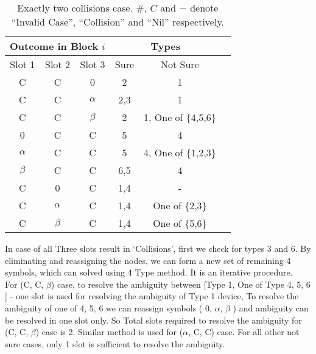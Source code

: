 \documentclass[fleqn]{article}
\begin{document}
\begin {table} 
\centering
\begin{tabular}{|c|c|c|c|c|c|} 
\hline
\multicolumn{3}{|c|}{Outcome in Block $i$} & \multicolumn{2}{c|}{Types} \\ \hline
Slot 1       & Slot 2       & Slot 3       & Sure & Not Sure            \\ \hline
C            & C            & 0            & 2    & 1                   \\ \hline
C            & C            & $\alpha$     & 2,3  & 1                   \\ \hline
C            & C            & $\beta$      & 2    & 1, One of \{4,5,6\} \\ \hline
0            & C            & C            & 5    & 4                   \\ \hline
$\alpha$     & C            & C            & 5    & 4, One of \{1,2,3\} \\ \hline
$\beta$      & C            & C            & 6,5  & 4                   \\ \hline
C            & 0            & C            & 1,4  & -                   \\ \hline
C            & $\alpha$     & C            & 1,4  & One of \{2,3\}      \\ \hline
C            & $\beta$      & C            & 1,4  & One of \{5,6\}      \\ \hline

\end{tabular}
\caption{Exactly two collisions case. \#, $C$ and $-$ denote ``Invalid Case'', ``Collision'' and  ``Nil'' respectively.}
\label{Tab_TwoC1}
\end{table}


In case of all Three slots result in `Collisions', first we check for types 3 and 6. By eliminating and reassigning the nodes, we can form a new set of remaining 4 symbols, which can solved using 4 Type method. It is an iterative procedure. \\
For (C, C, $\beta$) case, to resolve the ambiguity between [Type 1, One of Type {4, 5, 6} ] - one slot is used for resolving the ambiguity of Type 1 device, To resolve the ambiguity of one of {4, 5, 6} we can reassign symbols ( 0, $\alpha$, $\beta$ ) and ambiguity can be resolved in one slot only. So Total slots required to resolve the ambiguity for (C, C, $\beta$) case is 2. Similar method is used for ($\alpha$, C, C) case. For all other not sure cases, only 1 slot is sufficient to resolve the ambiguity.  
\end{document}
